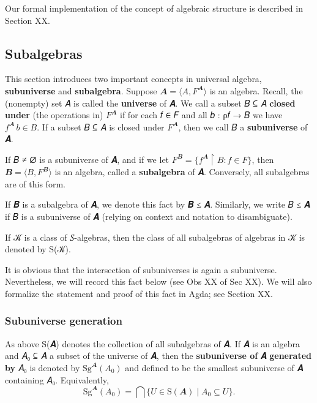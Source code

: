 \documentclass[sigplan,screen]{acmart}
\begin{document}
Our formal implementation of the concept of algebraic structure is described in Section XX.

\subsection{Subalgebras}\label{subalgebras}
This section introduces two important concepts in universal algebra, \textbf{subuniverse} and \textbf{subalgebra}. Suppose \(𝑨 = ⟨A, F^𝑨⟩\) is an algebra. Recall, the (nonempty) set 𝐴 is called the \textbf{universe} of 𝑨. We call a subset 𝐵 ⊆ 𝐴 \textbf{closed under} (the operations in) \(F^𝑨\) if for each 𝑓 ∈ 𝐹 and all 𝑏 : ρ𝑓 → 𝐵 we have \(f^𝑨 \, b ∈ B\). If a subset 𝐵 ⊆ 𝐴 is closed under \(F^𝑨\), then we call 𝐵 a \textbf{subuniverse} of 𝑨.

If 𝐵 ≠ ∅ is a subuniverse of 𝑨, and if we let \(F^𝑩 = \{ f^𝑨 ↾ B : f ∈ F \}\), then \(𝑩 = ⟨ B, F^𝑩 ⟩\) is an algebra,
called a \textbf{subalgebra} of 𝑨. Conversely, all subalgebras are of this form.

If 𝑩 is a subalgebra of 𝑨, we denote this fact by 𝑩 ≤ 𝑨. Similarly, we write 𝐵 ≤ 𝑨 if 𝐵 is a subuniverse of 𝑨 (relying on context and notation to disambiguate).


If 𝒦 is a class of 𝑆-algebras, then the class of all subalgebras of algebras in 𝒦 is denoted by S(𝒦).

It is obvious that the intersection of subuniverses is again a subuniverse. Nevertheless, we will record this fact below (see Obs XX of Sec XX). %
We will also formalize the statement and proof of this fact in Agda; see Section XX. %

\subsubsection{Subuniverse generation}\label{subuniverse-generation}
As above S(𝑨) denotes the collection of all subalgebras of 𝑨. If 𝑨 is an algebra and 𝐴₀ ⊆ 𝐴 a subset of the universe of 𝑨, then the \textbf{subuniverse of} 𝑨 \textbf{generated by} 𝐴₀ is denoted by \(\mathrm{Sg}^𝑨(A_0)\) and defined to be the smallest subuniverse of 𝑨 containing 𝐴₀. Equivalently,
\[\mathrm{Sg}^{𝑨}(A_0)  =  ⋂ \{ U ∈ \mathrm S(𝑨) ∣ A_0 ⊆ U \}.\]
\end{document}
